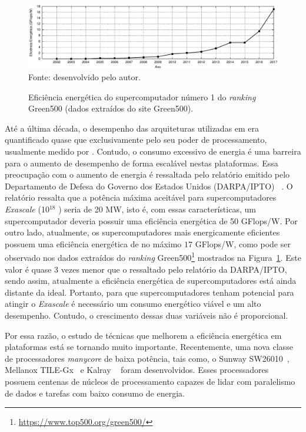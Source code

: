 
\begin{figure}[t]
	\centering
	\caption{Eficiência energética do supercomputador número 1 do
        \textit{ranking} Green500 (dados extraídos do site Green500).}
    \includegraphics[width=\textwidth]{figs/green500.pdf} \\
    Fonte: desenvolvido pelo autor.
	\label{fig:graphEnergy}
\end{figure}


Até a última década, o desempenho das arquiteturas utilizadas em \hpc era quantificado quase
que exclusivamente pelo seu poder de processamento, usualmente medido por
\flops. Contudo, o consumo excessivo de energia é uma barreira para o aumento de
desempenho de forma escalável nestas plataformas.
Essa preocupação com o aumento de energia é ressaltada pelo relatório emitido
pelo Departamento de Defesa do Governo dos Estados Unidos (DARPA/IPTO)
~\cite{Kogge2008}. O relatório ressalta que a potência máxima aceitável para supercomputadores
\textit{Exascale} (10$^{18}$ \flops) seria de 20 MW, isto é, com
essas características, um supercomputador deveria possuir uma eficiência energética de 50 GFlops/W.
Por outro lado, atualmente, os supercomputadores mais energicamente eficientes
possuem uma eficiência energética de no máximo $17$ GFlops/W, como pode ser observado nos dados extraídos do \textit{ranking}
Green500\footnote{\url{https://www.top500.org/green500/}} mostrados na Figura~\ref{fig:graphEnergy}.
Este valor é quase 3 vezes menor que o ressaltado pelo
relatório da DARPA/IPTO, sendo assim, atualmente a eficiência energética de
supercomputadores está ainda distante da ideal. Portanto, para que
supercomputadores tenham potencial para atingir o \textit{Exascale} é necessário
um consumo energético viável e um alto desempenho. Contudo, o crescimento dessas
duas variáveis não é proporcional.


Por essa razão, o estudo de técnicas que melhorem a eficiência energética em
plataformas \hpc está se tornando muito importante.  Recentemente, uma nova 
classe de processadores \textit{manycore} de baixa potência, tais como, o Sunway
SW26010~\cite{sunway:2016}, Mellanox TILE-Gx~\cite{Valero:2012} e Kalray
\mppa~\cite{Castro-IA3:2013} foram desenvolvidos. Esses processadores possuem
centenas de núcleos de processamento capazes de lidar com paralelismo de dados e
tarefas com baixo consumo de energia.

